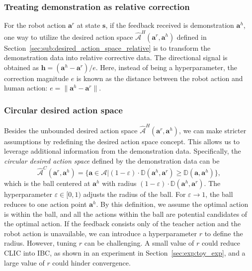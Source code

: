 \subsubsection{Treating demonstration as relative correction}
For the robot action $\bm a^r$ at state $\bm s$,
if the feedback received is demonstration $\bm a^h$, one way to utilize the desired action space $\hat{\mathcal{A}}^H(\bm a^r, \bm a^h)$  defined in Section~\ref{sec:sub:desired_action_space_relative} is to transform the demonstration data into relative corrective data. 
The directional signal is obtained as $\bm h = (\bm a^h - \bm a^r) /e$.
Here, instead of being a hyperparameter, the correction magnitude $e$ is known as the distance between the robot action and human action: $e = \| \bm a^h - \bm a^r \|$.


\subsubsection{Circular desired action space}
Besides the unbounded desired action space $\hat{\mathcal{A}}^H(\bm a^r, \bm a^h)$, we can make stricter assumptions by redefining the desired action space concept.
This allows us to leverage additional information from the demonstration data.
Specifically, the \emph{circular desired action space} defined by the demonstration data can be 
\begin{equation}
    \hat{\mathcal{A}}^C{(\bm a^r, \bm a^h)} = \{ \bm a \in \mathcal{A} |(1-\varepsilon) \cdot \mathbb{D}(\bm a^h, \bm a^r) \geq \mathbb{D}(\bm a, \bm a^h) \},  
    \label{eq:desired_circular_space}
\end{equation}
which is the ball centered at $\bm a^h$ with radius $(1-\varepsilon) \cdot \mathbb{D}(\bm a^h, \bm a^r)$.
The hyperparameter $\varepsilon \in [0, 1)$ adjusts the radius of the ball. 
For $\varepsilon \rightarrow 1$, the ball reduces to one action point $\bm a^h$. 
By this definition, we assume the optimal action is within the ball, and all the actions within the ball are potential candidates of the optimal action. 
If the feedback consists only of the teacher action and the robot action is unavailable, we can introduce a hyperparameter $r$ to define the radius.  However, tuning $r$ can be challenging. A small value of $r$ could reduce CLIC into IBC, as shown in an experiment in Section~\ref{sec:exp:toy_exp}, and a large value of $r$ could hinder convergence. 

